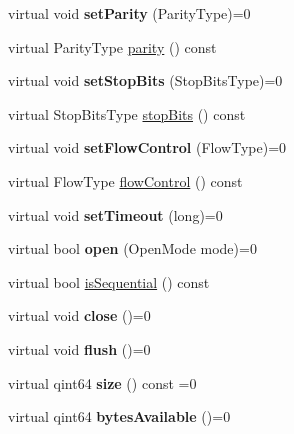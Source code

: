 \begin{DoxyCompactItemize}
virtual void {\bfseries set\+Parity} (Parity\+Type)=0
\item 
virtual Parity\+Type \mbox{\hyperlink{class_qext_serial_base_a7b35a11a804f9ee86b07db8a5b5bc0ee}{parity}} () const
\item 
\mbox{\label{class_qext_serial_base_afafca39575da5ab668671bff89fdd4bc}} 
virtual void {\bfseries set\+Stop\+Bits} (Stop\+Bits\+Type)=0
\item 
virtual Stop\+Bits\+Type \mbox{\hyperlink{class_qext_serial_base_a9d0d52efbebaa1d832bb9c9b2c40532f}{stop\+Bits}} () const
\item 
\mbox{\label{class_qext_serial_base_a976c031b3a51bc71abe7804953e0d366}} 
virtual void {\bfseries set\+Flow\+Control} (Flow\+Type)=0
\item 
virtual Flow\+Type \mbox{\hyperlink{class_qext_serial_base_a099a89f5492e6ff387dd29132cc3ccd0}{flow\+Control}} () const
\item 
\mbox{\label{class_qext_serial_base_a3d4a390ed7ac53d920855a820449a6d1}} 
virtual void {\bfseries set\+Timeout} (long)=0
\item 
\mbox{\label{class_qext_serial_base_a754cf108d4b7114b1dd538ef6dd65d1a}} 
virtual bool {\bfseries open} (Open\+Mode mode)=0
\item 
virtual bool \mbox{\hyperlink{class_qext_serial_base_ae92ca5d58748d206a379f063e6412f17}{is\+Sequential}} () const
\item 
\mbox{\label{class_qext_serial_base_a2a4aea428bc05a88f86849bb7478c082}} 
virtual void {\bfseries close} ()=0
\item 
\mbox{\label{class_qext_serial_base_a58df9d786aa70dfe9f547d4118103f39}} 
virtual void {\bfseries flush} ()=0
\item 
\mbox{\label{class_qext_serial_base_a86fc9d6239b7d136a9d80b93a727e093}} 
virtual qint64 {\bfseries size} () const =0
\item 
\mbox{\label{class_qext_serial_base_a7e130a0ba5a0a9ba95ce5f75a5e2c526}} 
virtual qint64 {\bfseries bytes\+Available} ()=0

\end{DoxyCompactItemize}
